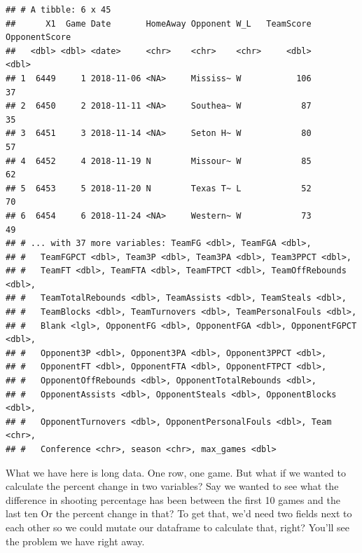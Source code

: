 \documentclass[]{book}
\newenvironment{Shaded}{\begin{snugshade}}{\end{snugshade}}
\newcommand{\KeywordTok}[1]{\textcolor[rgb]{0.13,0.29,0.53}{\textbf{#1}}}
\newcommand{\DataTypeTok}[1]{\textcolor[rgb]{0.13,0.29,0.53}{#1}}
\newcommand{\DecValTok}[1]{\textcolor[rgb]{0.00,0.00,0.81}{#1}}
\newcommand{\StringTok}[1]{\textcolor[rgb]{0.31,0.60,0.02}{#1}}
\newcommand{\OperatorTok}[1]{\textcolor[rgb]{0.81,0.36,0.00}{\textbf{#1}}}
\newcommand{\NormalTok}[1]{#1}
\begin{document}
\begin{verbatim}
## # A tibble: 6 x 45
##      X1  Game Date       HomeAway Opponent W_L   TeamScore OpponentScore
##   <dbl> <dbl> <date>     <chr>    <chr>    <chr>     <dbl>         <dbl>
## 1  6449     1 2018-11-06 <NA>     Mississ~ W           106            37
## 2  6450     2 2018-11-11 <NA>     Southea~ W            87            35
## 3  6451     3 2018-11-14 <NA>     Seton H~ W            80            57
## 4  6452     4 2018-11-19 N        Missour~ W            85            62
## 5  6453     5 2018-11-20 N        Texas T~ L            52            70
## 6  6454     6 2018-11-24 <NA>     Western~ W            73            49
## # ... with 37 more variables: TeamFG <dbl>, TeamFGA <dbl>,
## #   TeamFGPCT <dbl>, Team3P <dbl>, Team3PA <dbl>, Team3PPCT <dbl>,
## #   TeamFT <dbl>, TeamFTA <dbl>, TeamFTPCT <dbl>, TeamOffRebounds <dbl>,
## #   TeamTotalRebounds <dbl>, TeamAssists <dbl>, TeamSteals <dbl>,
## #   TeamBlocks <dbl>, TeamTurnovers <dbl>, TeamPersonalFouls <dbl>,
## #   Blank <lgl>, OpponentFG <dbl>, OpponentFGA <dbl>, OpponentFGPCT <dbl>,
## #   Opponent3P <dbl>, Opponent3PA <dbl>, Opponent3PPCT <dbl>,
## #   OpponentFT <dbl>, OpponentFTA <dbl>, OpponentFTPCT <dbl>,
## #   OpponentOffRebounds <dbl>, OpponentTotalRebounds <dbl>,
## #   OpponentAssists <dbl>, OpponentSteals <dbl>, OpponentBlocks <dbl>,
## #   OpponentTurnovers <dbl>, OpponentPersonalFouls <dbl>, Team <chr>,
## #   Conference <chr>, season <chr>, max_games <dbl>
\end{verbatim}

What we have here is long data. One row, one game. But what if we wanted
to calculate the percent change in two variables? Say we wanted to see
what the difference in shooting percentage has been between the first 10
games and the last ten Or the percent change in that? To get that, we'd
need two fields next to each other so we could mutate our dataframe to
calculate that, right? You'll see the problem we have right away.

\begin{Shaded}
\end{Shaded}
\end{document}
